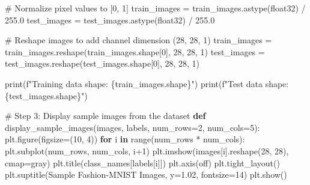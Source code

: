 \documentclass[
  letterpaper,
  DIV=11,
  numbers=noendperiod]{scrreprt}
\newenvironment{Shaded}{\begin{snugshade}}{\end{snugshade}}
\newcommand{\BuiltInTok}[1]{\textcolor[rgb]{0.00,0.23,0.31}{#1}}
\newcommand{\CommentTok}[1]{\textcolor[rgb]{0.37,0.37,0.37}{#1}}
\newcommand{\ControlFlowTok}[1]{\textcolor[rgb]{0.00,0.23,0.31}{\textbf{#1}}}
\newcommand{\DecValTok}[1]{\textcolor[rgb]{0.68,0.00,0.00}{#1}}
\newcommand{\FloatTok}[1]{\textcolor[rgb]{0.68,0.00,0.00}{#1}}
\newcommand{\KeywordTok}[1]{\textcolor[rgb]{0.00,0.23,0.31}{\textbf{#1}}}
\newcommand{\NormalTok}[1]{\textcolor[rgb]{0.00,0.23,0.31}{#1}}
\newcommand{\OperatorTok}[1]{\textcolor[rgb]{0.37,0.37,0.37}{#1}}
\newcommand{\SpecialCharTok}[1]{\textcolor[rgb]{0.37,0.37,0.37}{#1}}
\newcommand{\SpecialStringTok}[1]{\textcolor[rgb]{0.13,0.47,0.30}{#1}}
\newcommand{\StringTok}[1]{\textcolor[rgb]{0.13,0.47,0.30}{#1}}
\begin{document}
\begin{Shaded}
\begin{Highlighting}[]
\CommentTok{\# Normalize pixel values to [0, 1]}
\NormalTok{train\_images }\OperatorTok{=}\NormalTok{ train\_images.astype(}\StringTok{\textquotesingle{}float32\textquotesingle{}}\NormalTok{) }\OperatorTok{/} \FloatTok{255.0}
\NormalTok{test\_images }\OperatorTok{=}\NormalTok{ test\_images.astype(}\StringTok{\textquotesingle{}float32\textquotesingle{}}\NormalTok{) }\OperatorTok{/} \FloatTok{255.0}

\CommentTok{\# Reshape images to add channel dimension (28, 28, 1)}
\NormalTok{train\_images }\OperatorTok{=}\NormalTok{ train\_images.reshape(train\_images.shape[}\DecValTok{0}\NormalTok{], }\DecValTok{28}\NormalTok{, }\DecValTok{28}\NormalTok{, }\DecValTok{1}\NormalTok{)}
\NormalTok{test\_images }\OperatorTok{=}\NormalTok{ test\_images.reshape(test\_images.shape[}\DecValTok{0}\NormalTok{], }\DecValTok{28}\NormalTok{, }\DecValTok{28}\NormalTok{, }\DecValTok{1}\NormalTok{)}

\BuiltInTok{print}\NormalTok{(}\SpecialStringTok{f"Training data shape: }\SpecialCharTok{\{}\NormalTok{train\_images}\SpecialCharTok{.}\NormalTok{shape}\SpecialCharTok{\}}\SpecialStringTok{"}\NormalTok{)}
\BuiltInTok{print}\NormalTok{(}\SpecialStringTok{f"Test data shape: }\SpecialCharTok{\{}\NormalTok{test\_images}\SpecialCharTok{.}\NormalTok{shape}\SpecialCharTok{\}}\SpecialStringTok{"}\NormalTok{)}

\CommentTok{\# Step 3: Display sample images from the dataset}
\KeywordTok{def}\NormalTok{ display\_sample\_images(images, labels, num\_rows}\OperatorTok{=}\DecValTok{2}\NormalTok{, num\_cols}\OperatorTok{=}\DecValTok{5}\NormalTok{):}
\NormalTok{    plt.figure(figsize}\OperatorTok{=}\NormalTok{(}\DecValTok{10}\NormalTok{, }\DecValTok{4}\NormalTok{))}
    \ControlFlowTok{for}\NormalTok{ i }\KeywordTok{in} \BuiltInTok{range}\NormalTok{(num\_rows }\OperatorTok{*}\NormalTok{ num\_cols):}
\NormalTok{        plt.subplot(num\_rows, num\_cols, i}\OperatorTok{+}\DecValTok{1}\NormalTok{)}
\NormalTok{        plt.imshow(images[i].reshape(}\DecValTok{28}\NormalTok{, }\DecValTok{28}\NormalTok{), cmap}\OperatorTok{=}\StringTok{\textquotesingle{}gray\textquotesingle{}}\NormalTok{)}
\NormalTok{        plt.title(class\_names[labels[i]])}
\NormalTok{        plt.axis(}\StringTok{\textquotesingle{}off\textquotesingle{}}\NormalTok{)}
\NormalTok{    plt.tight\_layout()}
\NormalTok{    plt.suptitle(}\StringTok{\textquotesingle{}Sample Fashion{-}MNIST Images\textquotesingle{}}\NormalTok{, y}\OperatorTok{=}\FloatTok{1.02}\NormalTok{, fontsize}\OperatorTok{=}\DecValTok{14}\NormalTok{)}
\NormalTok{    plt.show()}


\end{Highlighting}
\end{Shaded}
\end{document}
